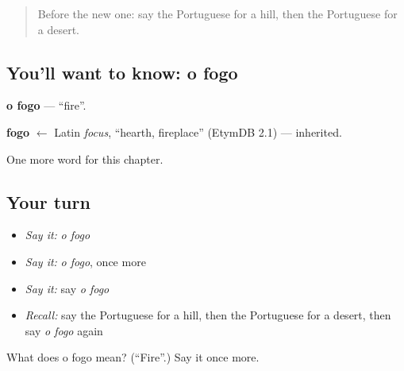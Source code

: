 \begin{quote}
Before the new one: say the Portuguese for a hill, then the Portuguese for a desert.
\end{quote}

\subsection*{You'll want to know: o fogo}
\textbf{o fogo} — \textquotedblleft{}fire\textquotedblright{}.

\begin{cousinweb}
\textbf{fogo} $\leftarrow$ Latin \emph{focus}, \textquotedblleft{}hearth, fireplace\textquotedblright{} (EtymDB 2.1) — inherited.
\end{cousinweb}

\begin{grammarlens}[title={What you've built}]
One more word for this chapter.
\end{grammarlens}

\subsection*{Your turn}
\begin{itemize}
\raggedright
  \item \emph{Say it:} \emph{o fogo}
  \item \emph{Say it:} \emph{o fogo}, once more
  \item \emph{Say it:} say \emph{o fogo}
  \item \emph{Recall:} say the Portuguese for a hill, then the Portuguese for a desert, then say \emph{o fogo} again
\end{itemize}

\begin{tcolorbox}[breakable,colback=teal!4,colframe=teal!35!black,title={Before you move on}]
What does o fogo mean? (\textquotedblleft{}Fire\textquotedblright{}.) Say it once more.
\end{tcolorbox}
